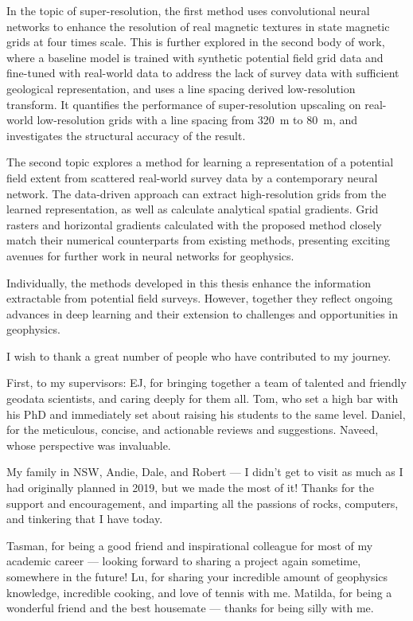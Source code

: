 \documentclass[12pt,a4paper,notitlepage]{report} %
\begin{document}
In the topic of super-resolution, the first method uses convolutional neural networks to enhance the resolution of real magnetic textures in state magnetic grids at four times scale.
This is further explored in the second body of work, where a baseline model is trained with synthetic potential field grid data and fine-tuned with real-world data to address the lack of survey data with sufficient geological representation, and uses a line spacing derived low-resolution transform.
It quantifies the performance of super-resolution upscaling on real-world low-resolution grids with a line spacing from \SI{320}{\m} to \SI{80}{\m}, and investigates the structural accuracy of the result.

The second topic explores a method for learning a representation of a potential field extent from scattered real-world survey data by a contemporary neural network.
The data-driven approach can extract high-resolution grids from the learned representation, as well as calculate analytical spatial gradients.
Grid rasters and horizontal gradients calculated with the proposed method closely match their numerical counterparts from existing methods, presenting exciting avenues for further work in neural networks for geophysics.

Individually, the methods developed in this thesis enhance the information extractable from potential field surveys.
However, together they reflect ongoing advances in deep learning and their extension to challenges and opportunities in geophysics.

\newpage{}

I wish to thank a great number of people who have contributed to my journey.

First, to my supervisors:
EJ, for bringing together a team of talented and friendly geodata scientists, and caring deeply for them all.
Tom, who set a high bar with his PhD and immediately set about raising his students to the same level.
Daniel, for the meticulous, concise, and actionable reviews and suggestions.
Naveed, whose perspective was invaluable.

My family in NSW, Andie, Dale, and Robert --- I didn't get to visit as much as I had originally planned in 2019, but we made the most of it! Thanks for the support and encouragement, and imparting all the passions of rocks, computers, and tinkering that I have today.

Tasman, for being a good friend and inspirational colleague for most of my academic career --- looking forward to sharing a project again sometime, somewhere in the future!
Lu, for sharing your incredible amount of geophysics knowledge, incredible cooking, and love of tennis with me.
Matilda, for being a wonderful friend and the best housemate --- thanks for being silly with me.
\end{document}
